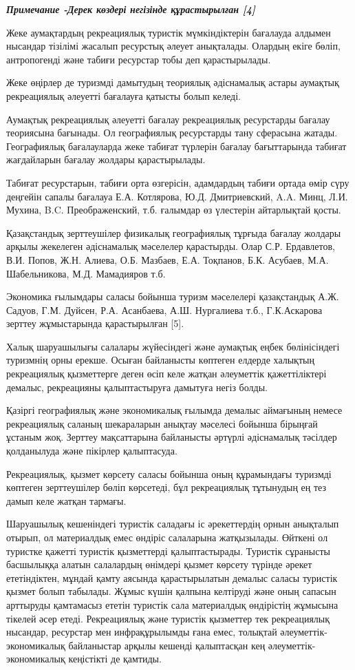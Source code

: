 \emph{{\bfseries Примечание -Дерек көздері негізінде құрастырылған
{[}4{]}}}

Жеке аумақтардың рекреациялық туристік мүмкіндіктерін бағалауда алдымен
нысандар тізілімі жасалып ресурстық әлеует анықталады. Олардың екіге
бөліп, антропогенді және табиғи ресурстар тобы деп қарастырылады.

Жеке өңірлер де туризмді дамытудың теориялық әдіснамалық астары аумақтық
рекреациялық әлеуетті бағалауға қатысты болып келеді.

Аумақтық рекреациялық әлеуетті бағалау рекреациялық ресурстарды бағалау
теориясына бағынады. Ол географиялық ресурстарды тану сферасына жатады.
Географиялық бағалауларда жеке табиғат түрлерін бағалау бағыттарында
табиғат жағдайларын бағалау жолдары қарастырылады.

Табиғат ресурстарын, табиғи орта өзгерісін, адамдардың табиғи ортада
өмір сүру деңгейін сапалы бағалауа Е.А. Котлярова, Ю.Д. Дмитриевский,
A.A. Минц, Л.И. Мухина, B.C. Преображенский, т.б. ғалымдар өз үлестерін
айтарлықтай қосты.

Қазақстандық зерттеушілер физикалық географиялық тұрғыда бағалау жолдары
арқылы жекелеген әдіснамалық мәселелер қарастырды. Олар С.Р. Ердавлетов,
В.И. Попов, Ж.Н. Алиева, О.Б. Мазбаев, Е.А. Тоқпанов, Б.К. Асубаев, М.А.
Шабельникова, М.Д. Мамадияров т.б.

Экономика ғылымдары саласы бойынша туризм мәселелері қазақстандық А.Ж.
Садуов, Г.М. Дуйсен, Р.А. Асанбаева, А.Ш. Нургалиева т.б., Г.К.Аскарова
зерттеу жұмыстарында қарастырылған {[}5{]}.

Халық шаруашылығы салалары жүйесіндегі және аумақтық еңбек бөлінісіндегі
туризмнің орны ерекше. Осыған байланысты көптеген елдерде халықтың
рекреациялық қызметтерге деген өсіп келе жатқан әлеуметтік
қажеттіліктері демалыс, рекреацияны қалыптастыруға дамытуға негіз болды.

Қазіргі географиялық және экономикалық ғылымда демалыс аймағының немесе
рекреациялық саланың шекараларын анықтау мәселесі бойынша бірыңғай
ұстаным жоқ. Зерттеу мақсаттарына байланысты әртүрлі әдіснамалық
тәсілдер қолданылуда және пікірлер қалыптасуда.

Рекреациялық, қызмет көрсету саласы бойынша оның құрамындағы туризмді
көптеген зерттеушілер бөліп көрсетеді, бұл рекреациялық тұтынудың ең тез
дамып келе жатқан тармағы.

Шаруашылық кешеніндегі туристік саладағы іс әрекеттердің орнын анықталып
отырып, ол материалдық емес өндіріс салаларына жатқызылады. Өйткені ол
туристке қажетті туристік қызметтерді қалыптастырады. Туристік сұранысты
басшылыққа алатын салалардың өнімдері қызмет көрсету түрінде әрекет
ететіндіктен, мұндай қамту аясында қарастырылатын демалыс саласы
туристік қызмет болып табылады. Жұмыс күшін қалпына келтіруді және оның
сапасын арттыруды қамтамасыз ететін туристік сала материалдық өндірістің
жұмысына тікелей әсер етеді. Рекреациялық және туристік қызметтер тек
рекреациялық нысандар, ресурстар мен инфрақұрылымды ғана емес, толықтай
әлеуметтік-экономикалық байланыстар арқылы кешенді қалыптасқан кең
әлеуметтік-экономикалық кеңістікті де қамтиды.

